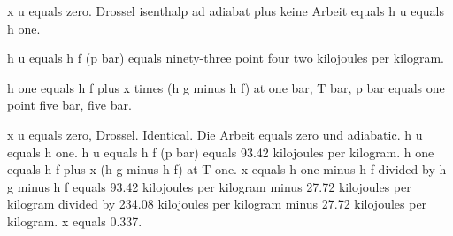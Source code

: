 x u equals zero. Drossel isenthalp ad adiabat plus keine Arbeit equals h u equals h one.

h u equals h f (p bar) equals ninety-three point four two kilojoules per kilogram.

h one equals h f plus x times (h g minus h f) at one bar, T bar, p bar equals one point five bar, five bar.

x u equals zero, Drossel. Identical. Die Arbeit equals zero und adiabatic. h u equals h one. h u equals h f (p bar) equals 93.42 kilojoules per kilogram. h one equals h f plus x (h g minus h f) at T one. x equals h one minus h f divided by h g minus h f equals 93.42 kilojoules per kilogram minus 27.72 kilojoules per kilogram divided by 234.08 kilojoules per kilogram minus 27.72 kilojoules per kilogram. x equals 0.337.